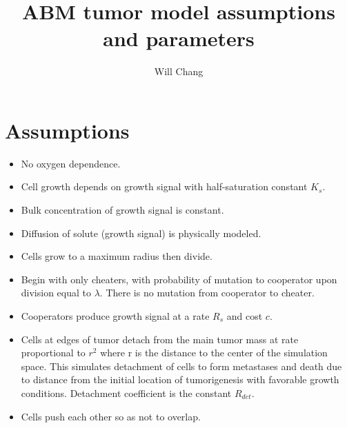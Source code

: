 \documentclass[11pt]{amsart}
\title{ABM tumor model assumptions and parameters}
\author{Will Chang}
\begin{document}
	
	
	\section{Assumptions}
		\begin{flushleft}
			\begin{itemize}
				\item No oxygen dependence. \\
				\item Cell growth depends on growth signal with half-saturation constant \(K_s\). \\
				\item Bulk concentration of growth signal is constant. \\
				\item Diffusion of solute (growth signal) is physically modeled. \\
				\item Cells grow to a maximum radius then divide. \\
				\item Begin with only cheaters, with probability of mutation to cooperator upon division equal to \(\lambda\). There is no mutation from cooperator to cheater. \\
				\item Cooperators produce growth signal at a rate \(R_s\) and cost \(c\). \\
				\item Cells at edges of tumor detach from the main tumor mass at rate proportional to \(r^2\) where r is the distance to the center of the simulation space. This simulates detachment of cells to form metastases and death due to distance from the initial location of tumorigenesis with favorable growth conditions. Detachment coefficient is the constant \(R_{det}\). \\
				\item Cells push each other so as not to overlap. \\
			\end{itemize}
		\end{flushleft}
	
\end{document}
